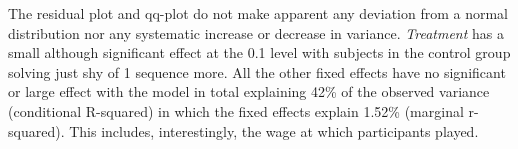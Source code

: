 The residual plot and qq-plot do not make apparent any deviation from a normal distribution nor any systematic increase or decrease in variance. \textit{Treatment} has a small although significant effect at the 0.1 level with subjects in the control group solving just shy of 1 sequence more. All the other fixed effects have no significant or large effect with the model in total explaining 42\% of the observed variance (conditional R-squared) in which the fixed effects explain 1.52\% (marginal r-squared). This includes, interestingly, the wage at which participants played.\\

\begin{table}[!htbp] \centering 
  \caption{Linear Mixed Model - Sequence Production} 
  \label{table:lmer_prod} 
\end{table} 


